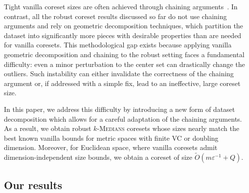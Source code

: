 \documentclass[11pt,letterpaper]{article}
\theoremstyle{definition}
\newcommand{\eps}{\varepsilon}
\newcommand{\ProblemName}[1]{\textsc{#1}}
\newcommand{\kMedian}{\ProblemName{$k$-Medians}\xspace}
\begin{document}
Tight vanilla coreset sizes are often achieved through chaining arguments~\cite{bansal2024sensitivity,Cohen25}. 
%
In contrast, all the robust coreset results discussed so far do not use chaining arguments and rely on geometric decomposition techniques, which partition the dataset into significantly more pieces with desirable properties than are needed for vanilla coresets. 
%
This methodological gap exists because applying vanilla geometric decomposition and chaining to the robust setting faces a fundamental difficulty: even a minor perturbation to the center set can drastically change the outliers. 
Such instability can either invalidate the correctness of the chaining argument or, if addressed with a simple fix, lead to an ineffective, large coreset size.

In this paper, we address this difficulty by introducing a new form of dataset decomposition which allows for a careful adaptation of the chaining arguments.
As a result, we obtain robust \kMedian coresets whose sizes nearly match the best known vanilla bounds for metric spaces with finite VC or doubling dimension.
Moreover, for Euclidean space, where vanilla coresets admit dimension-independent size bounds, we obtain a coreset of size $\tilde{O}(m\eps^{-1}+Q)$.

\subsection{Our results}
\label{sec:result}
\end{document}
